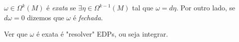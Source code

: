 
\begin{definition}
    \(\omega \in \Omega^k(M)\) é \emph{exata} se \(\exists \eta \in \Omega^{k-1}(M)\) tal que \(\omega = d\eta\). Por outro lado, se \(d\omega = 0 \) dizemos que \(\omega\) é \emph{fechada}. 
\end{definition}
\begin{note}
    Ver que \(\omega \) é exata é "resolver" EDPs, ou seja integrar. %
\end{note}
